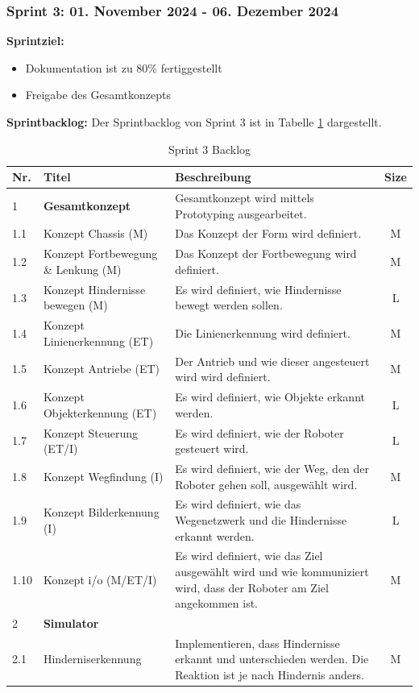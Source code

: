 \newpage
\subsubsection{Sprint 3: 01. November 2024 - 06. Dezember 2024}

\textbf{Sprintziel:}
\begin{itemize}
    \item Dokumentation ist zu 80\% fertiggestellt
    \item Freigabe des Gesamtkonzepts
\end{itemize}

\textbf{Sprintbacklog:} Der Sprintbacklog von Sprint 3 ist in Tabelle \ref{table:sprint3-backlog} dargestellt.

\begin{table}[H]
\centering
\small
\begin{tabularx}{\textwidth}{|l|l|X|c|}
\hline
  \textbf{Nr.} & \textbf{Titel} & \textbf{Beschreibung} & \textbf{Size}\\
  \hline
  1  & \textbf{Gesamtkonzept} & Gesamtkonzept wird mittels Prototyping ausgearbeitet.&\\
  \hline
  1.1  & Konzept Chassis (M) &  Das Konzept der Form wird definiert. & M\\
  \hline
  1.2  & Konzept Fortbewegung \& Lenkung (M) &  Das Konzept der Fortbewegung wird definiert. & M\\
  \hline
  1.3 & Konzept Hindernisse bewegen (M) & Es wird definiert, wie Hindernisse bewegt werden sollen. & L\\
  \hline
  1.4 & Konzept Linienerkennung (ET) & Die Linienerkennung wird definiert. & M\\
  \hline
  1.5 & Konzept Antriebe (ET) & Der Antrieb und wie dieser angesteuert wird wird definiert. & M\\
  \hline
  1.6 & Konzept Objekterkennung (ET) & Es wird definiert, wie Objekte erkannt werden. & L\\
  \hline
  1.7 & Konzept Steuerung (ET/I) & Es wird definiert, wie der Roboter gesteuert wird. & L\\
  \hline
    1.8 & Konzept Wegfindung (I) & Es wird definiert, wie der Weg, den der Roboter gehen soll, ausgewählt wird.  & M\\
\hline
    1.9 & Konzept Bilderkennung (I) & Es wird definiert, wie das Wegenetzwerk und die Hindernisse erkannt werden. & L\\
\hline
    1.10 & Konzept \acrfull{i/o} (M/ET/I) & Es wird definiert, wie das Ziel ausgewählt wird und wie kommuniziert wird, dass der Roboter am Ziel angekommen ist. & M\\
\hline

  2  & \textbf{Simulator} &&\\
  \hline
    2.1 & Hinderniserkennung & Implementieren, dass Hindernisse erkannt und unterschieden werden. Die Reaktion ist je nach Hindernis anders.& M \\
    \hline
  
\end{tabularx}
\caption{Sprint 3 Backlog}
\label{table:sprint3-backlog}
\end{table}


